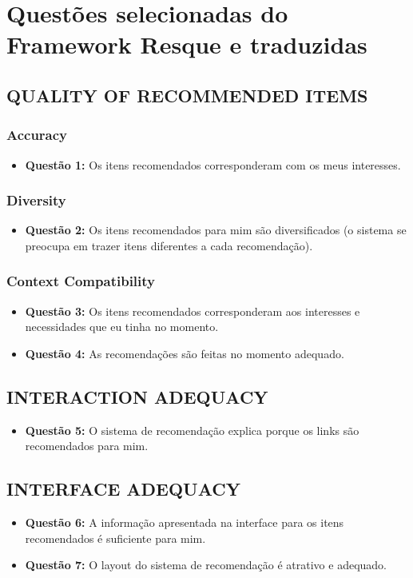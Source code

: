 \chapter{Questões selecionadas do Framework Resque e traduzidas}\label{ape:questionario-de-satisfacao}

\section{QUALITY OF RECOMMENDED ITEMS}
\subsection{Accuracy}
\begin{itemize}
\item \textbf{Questão 1:} Os itens recomendados corresponderam com os meus interesses.
\end{itemize}
\subsection{Diversity}
\begin{itemize}
\item \textbf{Questão 2:} Os itens recomendados para mim são diversificados (o sistema se preocupa em trazer itens diferentes a cada recomendação).
\end{itemize}
\subsection{Context Compatibility}
\begin{itemize}
\item \textbf{Questão 3:} Os itens recomendados corresponderam aos  interesses e necessidades que eu tinha no momento.
\item \textbf{Questão 4:} As recomendações são feitas no momento adequado.
\end{itemize}
\section{INTERACTION ADEQUACY}
\begin{itemize}
\item \textbf{Questão 5:} O sistema de recomendação explica porque os links são recomendados para mim.
\end{itemize}
\section{INTERFACE ADEQUACY}
\begin{itemize}
\item \textbf{Questão 6:} A informação apresentada na interface para os itens recomendados é suficiente para mim.
\item \textbf{Questão 7:} O layout do sistema de recomendação é atrativo e adequado.
\end{itemize}
